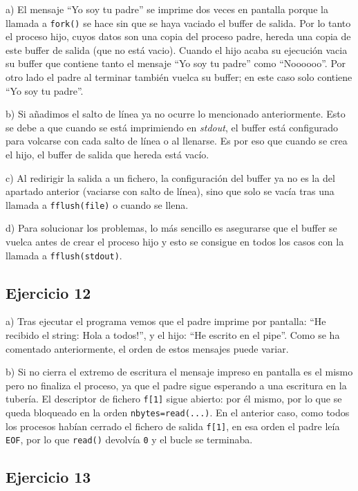\documentclass{article}
\begin{document}
a) El mensaje ``Yo soy tu padre'' se imprime dos veces en pantalla porque la llamada a \texttt{fork()} se hace sin que se haya vaciado el buffer de salida. Por lo tanto el proceso hijo, cuyos datos son una copia del proceso padre, hereda una copia de este buffer de salida (que no está vacio). Cuando el hijo acaba su ejecución vacia su buffer que contiene tanto el mensaje ``Yo soy tu padre'' como ``Noooooo''. Por otro lado el padre al terminar también vuelca su buffer; en este caso solo contiene ``Yo soy tu padre''.

b) Si añadimos el salto de línea ya no ocurre lo mencionado anteriormente. Esto se debe a que cuando se está imprimiendo en \textit{stdout}, el buffer está configurado para volcarse con cada salto de línea o al llenarse. Es por eso que cuando se crea el hijo, el buffer de salida que hereda está vacío.

c) Al redirigir la salida a un fichero, la configuración del buffer ya no es la del apartado anterior (vaciarse con salto de línea), sino que solo se vacía tras una llamada a \texttt{fflush(file)} o cuando se llena.

d) Para solucionar los problemas, lo más sencillo es asegurarse que el buffer se vuelca antes de crear el proceso hijo y esto se consigue en todos los casos con la llamada a \texttt{fflush(stdout)}.

\subsection*{Ejercicio 12}

a) Tras ejecutar el programa vemos que el padre imprime por pantalla: ``He recibido el string: Hola a todos!'', y el hijo: ``He escrito en el pipe''. Como se ha comentado anteriormente, el orden de estos mensajes puede variar.

b) Si no cierra el extremo de escritura el mensaje impreso en pantalla es el mismo pero no finaliza el proceso, ya que el padre sigue esperando a una escritura en la tubería. El descriptor de fichero \texttt{f[1]} sigue abierto: por él mismo, por lo que se queda bloqueado en la orden \texttt{nbytes=read(...)}. En el anterior caso, como todos los procesos habían cerrado el fichero de salida \texttt{f[1]}, en esa orden el padre leía \texttt{EOF}, por lo que \texttt{read()} devolvía \texttt {0} y el bucle se terminaba. 

\subsection*{Ejercicio 13}
\end{document}
